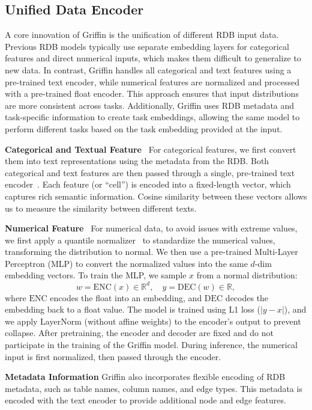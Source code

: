 \documentclass{article}
\theoremstyle{plain}
\theoremstyle{definition}
\theoremstyle{remark}
\begin{document}
\subsection{Unified Data Encoder}
A core innovation of Griffin is the unification of different RDB input data. Previous RDB models typically use separate embedding layers for categorical features and direct numerical inputs, which makes them difficult to generalize to new data. In contrast, Griffin handles all categorical and text features using a pre-trained text encoder, while numerical features are normalized and processed with a pre-trained float encoder. This approach ensures that input distributions are more consistent across tasks. Additionally, Griffin uses RDB metadata and task-specific information to create task embeddings, allowing the same model to perform different tasks based on the task embedding provided at the input.


\textbf{Categorical and Textual Feature}~
For categorical features, we first convert them into text representations using the metadata from the RDB. Both categorical and text features are then passed through a single, pre-trained text encoder~\citep{nussbaum2024nomic}. Each feature (or ``cell'') is encoded into a fixed-length vector, which captures rich semantic information. Cosine similarity between these vectors allows us to measure the similarity between different texts.


\textbf{Numerical Feature}~
For numerical data, to avoid issues with extreme values, we first apply a quantile normalizer~\citep{bolstad2003comparison} to standardize the numerical values, transforming the distribution to normal. We then use a pre-trained Multi-Layer Perceptron (MLP) to convert the normalized values into the same $d$-dim embedding vectors. To train the MLP, we sample $x$ from a normal distribution:
\begin{equation}
w = \text{ENC}(x) \in \mathbb{R}^d, \quad y = \text{DEC}(w) \in \mathbb{R},
\end{equation}
where $\text{ENC}$ encodes the float into an embedding, and $\text{DEC}$ decodes the embedding back to a float value. The model is trained using L1 loss ($|y - x|$), and we apply LayerNorm (without affine weights) to the encoder’s output to prevent collapse. After pretraining, the encoder and decoder are fixed and do not participate in the training of the Griffin model. During inference, the numerical input is first normalized, then passed through the encoder. 

\textbf{Metadata Information}
 Griffin also incorporates flexible encoding of RDB metadata, such as table names, column names, and edge types. This metadata is encoded with the text encoder to provide additional node and edge features.
\end{document}
